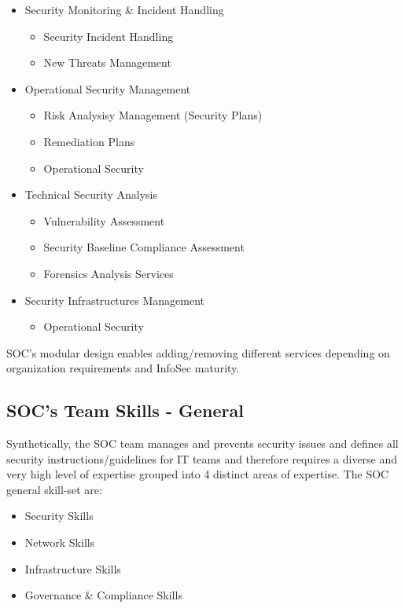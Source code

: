 \documentclass[8pt]{extarticle}
\begin{document}
\begin{multicols}{3}
\begin{itemize}
    \item Security Monitoring \& Incident Handling
    \begin{itemize}
        \item Security Incident Handling
        \item New Threats Management
    \end{itemize}
    \item Operational Security Management
    \begin{itemize}
        \item Risk Analysisy Management (Security Plans)
        \item Remediation Plans
        \item Operational Security
    \end{itemize}
    \item Technical Security Analysis
    \begin{itemize}
        \item Vulnerability Assessment
        \item Security Baseline Compliance Assessment
        \item Forensics Analysis Services
    \end{itemize}
    \item Security Infrastructures Management
    \begin{itemize}
        \item Operational Security
    \end{itemize}
\end{itemize}
\noindent
SOC’s modular design enables adding/removing different services depending on organization requirements and
InfoSec maturity.

\subsection{SOC's Team Skills - General}
Synthetically, the SOC team manages and prevents security issues and defines all security instructions/guidelines
for IT teams and therefore requires a diverse and very high level of expertise grouped into 4 distinct areas 
of expertise.
\noindent
The SOC general skill-set are:
\begin{itemize}
    \item Security Skills
    \item Network Skills
    \item Infrastructure Skills
    \item Governance \& Compliance Skills
\end{itemize}


\end{multicols}
\end{document}

